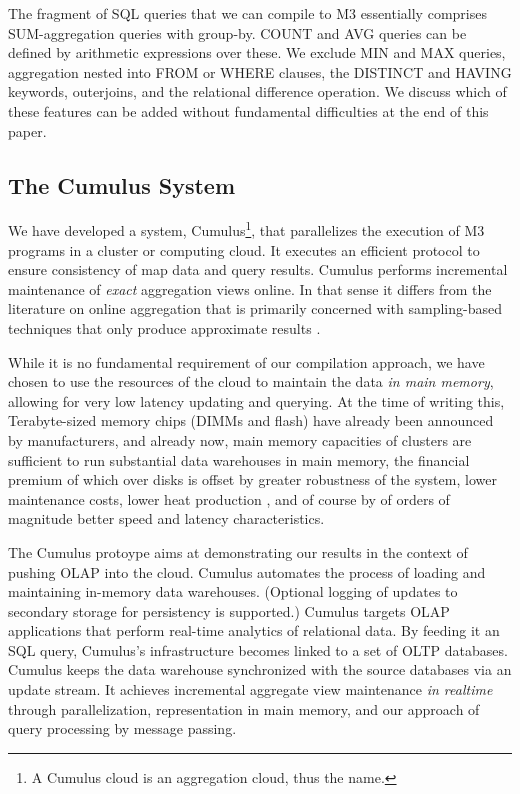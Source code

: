 The fragment of SQL queries that we can compile to M3 essentially comprises
SUM-agg\-regation queries with group-by.
COUNT and AVG queries can be defined by arithmetic expressions over these.
We exclude MIN and MAX queries, aggregation
nested into FROM or WHERE clauses, the DISTINCT and HAVING keywords,
outerjoins,
and the relational difference operation.
We discuss which of these features can be added without fundamental
difficulties at the end of this paper.


\subsection{The Cumulus System}


We have developed a system, Cumulus\footnote{A Cumulus cloud is an
aggregation cloud, thus the name.}, that parallelizes the
execution of M3 programs in a cluster or computing cloud.
It executes an efficient
protocol to ensure consistency of map data and query results.
%
Cumulus performs incremental maintenance of {\em exact}\/
aggregation views online.
In that sense it differs from the literature on online aggregation that
is primarily concerned with sampling-based techniques that only produce
approximate results
\cite{DBLP:conf/sigmod/HaasH99, DBLP:conf/sigmod/RusuXPWJJD08, DBLP:conf/sigmod/AcharyaGPR99}.


While it is no fundamental requirement of our compilation
approach, we have chosen to use the resources of the cloud to maintain
the data {\em in main memory}\/,
allowing for very low latency updating and querying.
At the time of writing this,
Terabyte-sized memory chips (DIMMs and flash) have already been announced by
manufacturers, and already now, main memory capacities of clusters
are sufficient to run substantial data warehouses in
main memory, the financial premium of which over disks is
offset by greater robustness of the system, lower maintenance
costs, lower heat production \cite{1154557}, and of course by of orders
of magnitude better speed and latency characteristics.

The Cumulus protoype aims at demonstrating our results in the context of
pushing OLAP into the cloud.
Cumulus automates  the process of loading
and  maintaining  in-memory  data  warehouses.
(Optional logging of updates to secondary storage
for persistency is supported.)
Cumulus targets OLAP applications  that perform real-time analytics of
relational data.  By feeding it an SQL query, Cumulus's infrastructure
becomes linked to  a set of OLTP databases.  Cumulus  keeps the
data warehouse synchronized with the source databases via an
update stream. It achieves incremental aggregate
view maintenance {\em in realtime}
through parallelization, representation in main memory, and
our approach of query processing by message passing.



